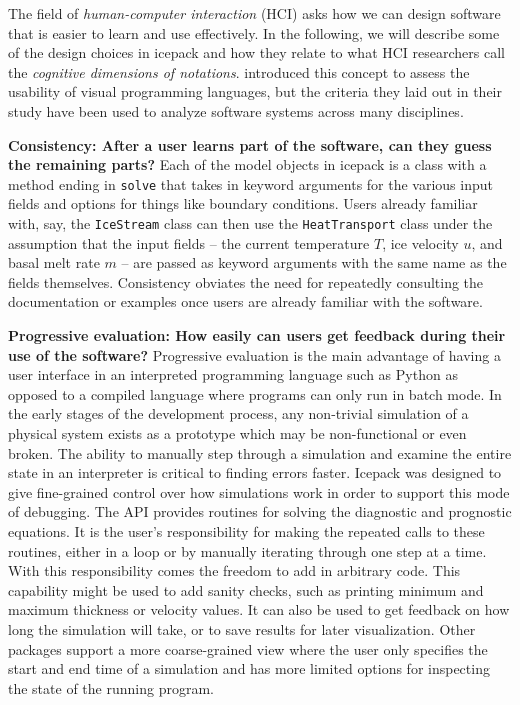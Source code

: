\documentclass[journal abbreviation, manuscript]{copernicus}
\begin{document}
The field of \emph{human-computer interaction} (HCI) asks how we can design software that is easier to learn and use effectively.
In the following, we will describe some of the design choices in icepack and how they relate to what HCI researchers call the \emph{cognitive dimensions of notations}.
\citet{green1996usability} introduced this concept to assess the usability of visual programming languages, but the criteria they laid out in their study have been used to analyze software systems across many disciplines.

\textbf{Consistency: After a user learns part of the software, can they guess the remaining parts?}
Each of the model objects in icepack is a class with a method ending in \texttt{solve} that takes in keyword arguments for the various input fields and options for things like boundary conditions.
Users already familiar with, say, the \texttt{IceStream} class can then use the \texttt{HeatTransport} class under the assumption that the input fields -- the current temperature $T$, ice velocity $u$, and basal melt rate $m$ -- are passed as keyword arguments with the same name as the fields themselves.
Consistency obviates the need for repeatedly consulting the documentation or examples once users are already familiar with the software.

\textbf{Progressive evaluation: How easily can users get feedback during their use of the software?}
Progressive evaluation is the main advantage of having a user interface in an interpreted programming language such as Python as opposed to a compiled language where programs can only run in batch mode.
In the early stages of the development process, any non-trivial simulation of a physical system exists as a prototype which may be non-functional or even broken.
The ability to manually step through a simulation and examine the entire state in an interpreter is critical to finding errors faster.
Icepack was designed to give fine-grained control over how simulations work in order to support this mode of debugging.
The API provides routines for solving the diagnostic and prognostic equations.
It is the user's responsibility for making the repeated calls to these routines, either in a loop or by manually iterating through one step at a time.
With this responsibility comes the freedom to add in arbitrary code.
This capability might be used to add sanity checks, such as printing minimum and maximum thickness or velocity values.
It can also be used to get feedback on how long the simulation will take, or to save results for later visualization.
Other packages support a more coarse-grained view where the user only specifies the start and end time of a simulation and has more limited options for inspecting the state of the running program.
\end{document}
